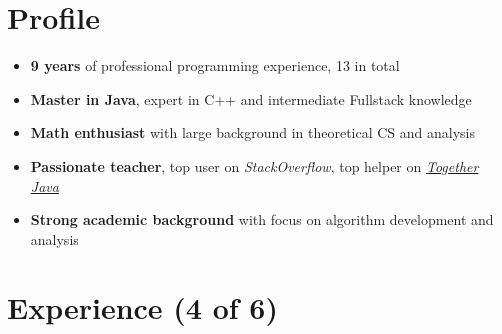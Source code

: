 \documentclass[letterpaper]{twentysecondcv} %
\begin{document}
\makesidebarFirst %

\section{Profile}

\begin{itemize}
	\item \textbf{9 years} of professional programming experience, 13 in total
	\item \textbf{Master in Java}, expert in C++ and intermediate Fullstack knowledge
	\item \textbf{Math enthusiast} with large background in theoretical CS and analysis
	\item \textbf{Passionate teacher}, top user on \textit{StackOverflow}, top helper on \textit{\href{https://togetherjava.duckdns.org/}{Together Java}}
	\item \textbf{Strong academic background} with focus on algorithm development and analysis
\end{itemize}

\vspace{6mm}


\section{Experience (4 of 6)}
\end{document}

